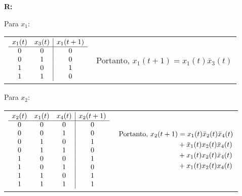 \documentclass[12pt]{article}
\newcommand{\answer}[1]{{\fontfamily{\rmdefault}\selectfont \textbf{R:} #1}}
\begin{document}
\answer {

Para $x_1$:

\begin{tabular}{c l}
$\begin{array}{cc | c}
  x_1 (t) &  x_3 (t) & x_1 (t + 1) \\
  \hline
    0     &     0    &     0       \\
    0     &     1    &     0       \\
    1     &     0    &     1       \\
    1     &     1    &     0       
\end{array}$

&

Portanto, $x_1 (t + 1) = x_1 (t) \bar x_3 (t)$ 
\end{tabular}


\vspace{.2cm}
Para $x_2$:

\begin{tabular}{c l}
$\begin{array}{ccc | c}
  x_2 (t) &  x_1 (t) & x_4 (t) & x_2 (t + 1) \\
  \hline 
    0     &     0    &     0   &     0       \\
    0     &     0    &     1   &     0       \\
    0     &     1    &     0   &     1       \\
    0     &     1    &     1   &     0       \\    
    1     &     0    &     0   &     1       \\
    1     &     0    &     1   &     0       \\
    1     &     1    &     0   &     1       \\
    1     &     1    &     1   &     1       \\    
\end{array}$

&

$\begin{aligned}[t]
  \textup{Portanto, } 
      x_2 (t + 1) &= x_1 (t) \bar{x}_2 (t)  \bar{x}_4(t) \\
                  &+ \bar{x}_1 (t) x_2 (t) \bar{x}_4 (t) \\
                  &+ x_1 (t) x_2 (t) \bar{x}_4(t) \\
                  &+ x_1 (t) x_2 (t) x_4(t) 
\end{aligned}$
\end{tabular}

}
\end{document}
